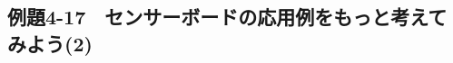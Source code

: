 \newpage
\subsection{例題4-17　センサーボードの応用例をもっと考えてみよう(2)}

\begin{description}
    \item {}
\end{description}


